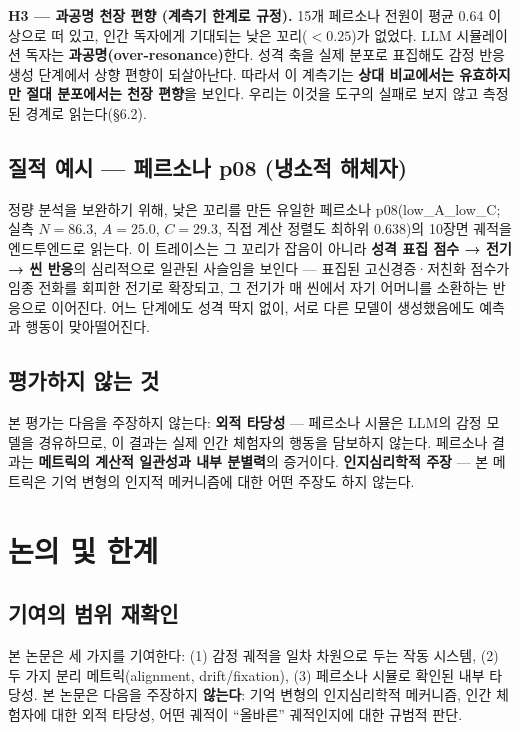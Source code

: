 \documentclass[11pt, a4paper]{article}
\begin{document}
\textbf{H3 --- 과공명 천장 편향 (계측기 한계로 규정).} 15개 페르소나 전원이 평균 0.64 이상으로 떠 있고, 인간 독자에게 기대되는 낮은 꼬리($< 0.25$)가 없었다. LLM 시뮬레이션 독자는 \textbf{과공명(over-resonance)}한다. 성격 축을 실제 분포로 표집해도 감정 반응 생성 단계에서 상향 편향이 되살아난다. 따라서 이 계측기는 \textbf{상대 비교에서는 유효하지만 절대 분포에서는 천장 편향}을 보인다. 우리는 이것을 도구의 실패로 보지 않고 측정된 경계로 읽는다(\S6.2).

\subsection{질적 예시 --- 페르소나 p08 (냉소적 해체자)}
정량 분석을 보완하기 위해, 낮은 꼬리를 만든 유일한 페르소나 p08(low\_A\_low\_C; 실측 $N=86.3$, $A=25.0$, $C=29.3$, 직접 계산 정렬도 최하위 0.638)의 10장면 궤적을 엔드투엔드로 읽는다. 이 트레이스는 그 꼬리가 잡음이 아니라 \textbf{성격 표집 점수 → 전기 → 씬 반응}의 심리적으로 일관된 사슬임을 보인다 --- 표집된 고신경증·저친화 점수가 임종 전화를 회피한 전기로 확장되고, 그 전기가 매 씬에서 자기 어머니를 소환하는 반응으로 이어진다. 어느 단계에도 성격 딱지 없이, 서로 다른 모델이 생성했음에도 예측과 행동이 맞아떨어진다.

\subsection{평가하지 않는 것}
본 평가는 다음을 주장하지 않는다: \textbf{외적 타당성} --- 페르소나 시뮬은 LLM의 감정 모델을 경유하므로, 이 결과는 실제 인간 체험자의 행동을 담보하지 않는다. 페르소나 결과는 \textbf{메트릭의 계산적 일관성과 내부 분별력}의 증거이다. \textbf{인지심리학적 주장} --- 본 메트릭은 기억 변형의 인지적 메커니즘에 대한 어떤 주장도 하지 않는다.

\section{논의 및 한계}

\subsection{기여의 범위 재확인}
본 논문은 세 가지를 기여한다: (1) 감정 궤적을 일차 차원으로 두는 작동 시스템, (2) 두 가지 분리 메트릭(alignment, drift/fixation), (3) 페르소나 시뮬로 확인된 내부 타당성. 본 논문은 다음을 주장하지 \textbf{않는다}: 기억 변형의 인지심리학적 메커니즘, 인간 체험자에 대한 외적 타당성, 어떤 궤적이 ``올바른'' 궤적인지에 대한 규범적 판단.
\end{document}

